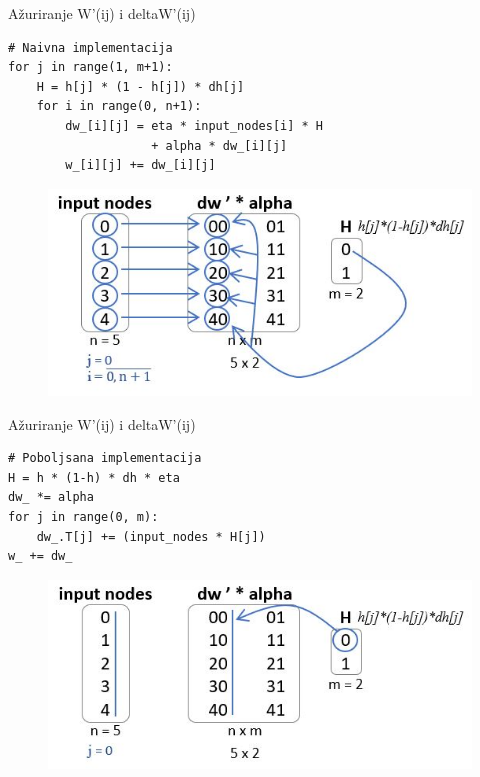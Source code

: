 \documentclass{beamer}
\begin{document}
\begin{frame}[fragile]{Ažuriranje W'(ij) i deltaW'(ij)}
\begin{verbatim}
# Naivna implementacija
for j in range(1, m+1):
    H = h[j] * (1 - h[j]) * dh[j]
    for i in range(0, n+1):
        dw_[i][j] = eta * input_nodes[i] * H 
                    + alpha * dw_[i][j]
        w_[i][j] += dw_[i][j]
\end{verbatim}
\begin{figure}
    \centering
    \includegraphics[scale=0.6]{azuriranje_w_.JPG}
\end{figure}
\end{frame}

\begin{frame}[fragile]{Ažuriranje W'(ij) i deltaW'(ij)}
\begin{verbatim}
# Poboljsana implementacija
H = h * (1-h) * dh * eta
dw_ *= alpha
for j in range(0, m):
    dw_.T[j] += (input_nodes * H[j])
w_ += dw_
\end{verbatim}
\begin{figure}
    \centering
    \includegraphics[scale=0.7]{poboljsano_azuriranje_w_.JPG}
\end{figure}
\end{frame}
\end{document}
